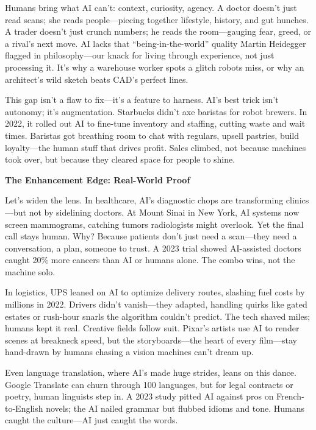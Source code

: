 \documentclass[
  Letterpaper,
]{scrbook}
\begin{document}
Humans bring what AI can't: context, curiosity, agency. A doctor doesn't
just read scans; she reads people---piecing together lifestyle, history,
and gut hunches. A trader doesn't just crunch numbers; he reads the
room---gauging fear, greed, or a rival's next move. AI lacks that
``being-in-the-world'' quality Martin Heidegger flagged in
philosophy---our knack for living through experience, not just
processing it. It's why a warehouse worker spots a glitch robots miss,
or why an architect's wild sketch beats CAD's perfect lines.

This gap isn't a flaw to fix---it's a feature to harness. AI's best
trick isn't autonomy; it's augmentation. Starbucks didn't axe baristas
for robot brewers. In 2022, it rolled out AI to fine-tune inventory and
staffing, cutting waste and wait times. Baristas got breathing room to
chat with regulars, upsell pastries, build loyalty---the human stuff
that drives profit. Sales climbed, not because machines took over, but
because they cleared space for people to shine.

\textbf{The Enhancement Edge: Real-World Proof}

Let's widen the lens. In healthcare, AI's diagnostic chops are
transforming clinics---but not by sidelining doctors. At Mount Sinai in
New York, AI systems now screen mammograms, catching tumors radiologists
might overlook. Yet the final call stays human. Why? Because patients
don't just need a scan---they need a conversation, a plan, someone to
trust. A 2023 trial showed AI-assisted doctors caught 20\% more cancers
than AI or humans alone. The combo wins, not the machine solo.

In logistics, UPS leaned on AI to optimize delivery routes, slashing
fuel costs by millions in 2022. Drivers didn't vanish---they adapted,
handling quirks like gated estates or rush-hour snarls the algorithm
couldn't predict. The tech shaved miles; humans kept it real. Creative
fields follow suit. Pixar's artists use AI to render scenes at breakneck
speed, but the storyboards---the heart of every film---stay hand-drawn
by humans chasing a vision machines can't dream up.

Even language translation, where AI's made huge strides, leans on this
dance. Google Translate can churn through 100 languages, but for legal
contracts or poetry, human linguists step in. A 2023 study pitted AI
against pros on French-to-English novels; the AI nailed grammar but
flubbed idioms and tone. Humans caught the culture---AI just caught the
words.
\end{document}
